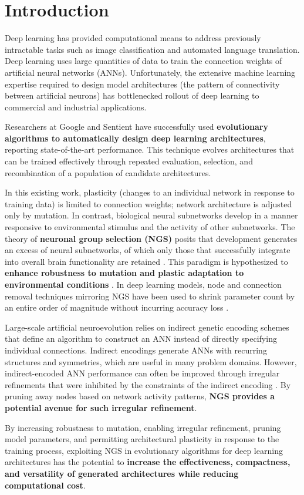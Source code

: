\section{Introduction}

Deep learning has provided computational means to address previously intractable tasks such as image classification and automated language translation.
Deep learning uses large quantities of data to train the connection weights of artificial neural networks (ANNs).
Unfortunately, the extensive machine learning expertise required to design model architectures (the pattern of connectivity between artificial neurons) has bottlenecked rollout of deep learning to commercial and industrial applications.

Researchers at Google \cite{real2017large} and Sentient \cite{miikkulainen2017evolving} have successfully used \textbf{evolutionary algorithms to automatically design deep learning architectures}, reporting state-of-the-art performance.
This technique evolves architectures that can be trained effectively through repeated evaluation, selection, and recombination of a population of candidate architectures.

In this existing work, plasticity (changes to an individual network in response to training data) is limited to connection weights;
network architecture is adjusted only by mutation.
In contrast, biological neural subnetworks develop in a manner responsive to environmental stimulus and the activity of other subnetworks.
The theory of \textbf{neuronal group selection (NGS)} posits that development generates an excess of neural subnetworks, of which only those that successfully integrate into overall brain functionality are retained \cite{sanes2011development}.
This paradigm is hypothesized to \textbf{enhance robustness to mutation and plastic adaptation to environmental conditions} \cite{downing2015intelligence}.
In deep learning models, node and connection removal techniques mirroring NGS have been used to shrink parameter count by an entire order of magnitude without incurring accuracy loss \cite{song2015learning}.

Large-scale artificial neuroevolution relies on indirect genetic encoding schemes that define an algorithm to construct an ANN instead of directly specifying individual connections.
Indirect encodings generate ANNs with recurring structures and symmetries, which are useful in many problem domains.
However, indirect-encoded ANN performance can often be improved through irregular refinements that were inhibited by the constraints of the indirect encoding \cite{clune2011performance}.
By pruning away nodes based on network activity patterns, \textbf{NGS provides a potential avenue for such irregular refinement}.

By increasing robustness to mutation, enabling irregular refinement, pruning model parameters, and permitting architectural plasticity in response to the training process, exploiting NGS in evolutionary algorithms for deep learning architectures has the potential to \textbf{increase the effectiveness, compactness, and versatility of generated architectures while reducing computational cost}.

